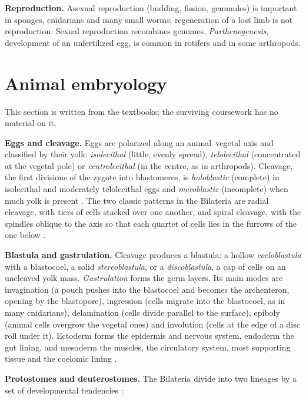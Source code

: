 \textbf{Reproduction.} Asexual reproduction
(budding, fission, gemmules) is important in
sponges, cnidarians and many small worms;
regeneration of a lost limb is not
reproduction. Sexual reproduction recombines
genomes. \emph{Parthenogenesis}, development
of an unfertilized egg, is common in rotifers
and in some arthropods.

\section{Animal embryology}
\label{section-embryology}

This section is written from the textbooks;
the surviving coursework has no material on
it.

\textbf{Eggs and cleavage.} Eggs are
polarized along an animal--vegetal axis and
classified by their yolk: \emph{isolecithal}
(little, evenly spread), \emph{telolecithal}
(concentrated at the vegetal pole) or
\emph{centrolecithal} (in the centre, as in
arthropods). Cleavage, the first divisions of
the zygote into blastomeres, is
\emph{holoblastic} (complete) in isolecithal
and moderately telolecithal eggs and
\emph{meroblastic} (incomplete) when much
yolk is present \cite[Chapter
4]{brusca2003invertebrates}. The two classic
patterns in the Bilateria are radial
cleavage, with tiers of cells stacked over
one another, and spiral cleavage, with the
spindles oblique to the axis so that each
quartet of cells lies in the furrows of the
one below \cite[Chapter
3]{hickman2002animal}.

\textbf{Blastula and gastrulation.} Cleavage
produces a blastula: a hollow
\emph{coeloblastula} with a blastocoel, a
solid \emph{stereoblastula}, or a
\emph{discoblastula}, a cap of cells on an
uncleaved yolk mass. \emph{Gastrulation}
forms the germ layers. Its main modes are
invagination (a pouch pushes into the
blastocoel and becomes the archenteron,
opening by the blastopore), ingression (cells
migrate into the blastocoel, as in many
cnidarians), delamination (cells divide
parallel to the surface), epiboly (animal
cells overgrow the vegetal ones) and
involution (cells at the edge of a disc roll
under it). Ectoderm forms the epidermis and
nervous system, endoderm the gut lining, and
mesoderm the muscles, the circulatory system,
most supporting tissue and the coelomic
lining \cite[Chapter
4]{brusca2003invertebrates}.

\textbf{Protostomes and deuterostomes.} The
Bilateria divide into two lineages by a set
of developmental tendencies \cite[Chapter
3]{hickman2002animal}:


